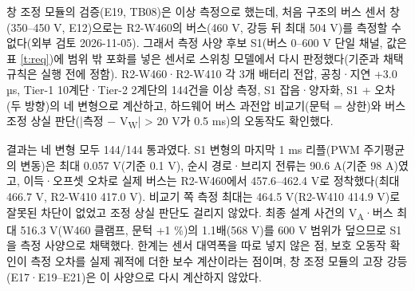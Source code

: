 창 조정 모듈의 검증(E19, TB08)은 이상 측정으로 했는데, 처음 구조의 버스 센서 창(350–450 V, E12)으로는 R2-W460의 버스(460 V, 강등 뒤 최대 504 V)를 측정할 수 없다(외부 검토 2026-11-05). 그래서 측정 사양 후보 S1(버스 0–600 V 단일 채널, 값은 표 \ref{t:req})에 범위 밖 포화를 넣은 센서로 스위칭 모델에서 다시 판정했다(기준과 채택 규칙은 실행 전에 정함). R2-W460·R2-W410 각 3개 배터리 전압, 공칭·지연 +3.0 µs, Tier-1 10계단·Tier-2 2계단의 144건을 이상 측정, S1 잡음·양자화, S1 + 오차(두 방향)의 네 변형으로 계산하고, 하드웨어 버스 과전압 비교기(문턱 = 상한)와 버스 조정 상실 판단(|측정 − V\textsubscript{W}| > 20 V가 0.5 ms)의 오동작도 확인했다.


결과는 네 변형 모두 144/144 통과였다. S1 변형의 마지막 1 ms 리플(PWM 주기평균의 변동)은 최대 0.057 V(기준 0.1 V), 순시 경로·브리지 전류는 90.6 A(기준 98 A)였고, 이득·오프셋 오차로 실제 버스는 R2-W460에서 457.6–462.4 V로 정착했다(최대 466.7 V, R2-W410 417.0 V). 비교기 쪽 측정 최대는 464.5 V(R2-W410 414.9 V)로 잘못된 차단이 없었고 조정 상실 판단도 걸리지 않았다. 최종 설계 사건의 V\textsubscript{A}·버스 최대 516.3 V(W460 클램프, 문턱 +1 \%)의 1.1배(568 V)를 600 V 범위가 덮으므로 S1을 측정 사양으로 채택했다. 한계는 센서 대역폭을 따로 넣지 않은 점, 보호 오동작 확인이 측정 오차를 실제 궤적에 더한 보수 계산이라는 점이며, 창 조정 모듈의 고장 강등(E17·E19–E21)은 이 사양으로 다시 계산하지 않았다.
